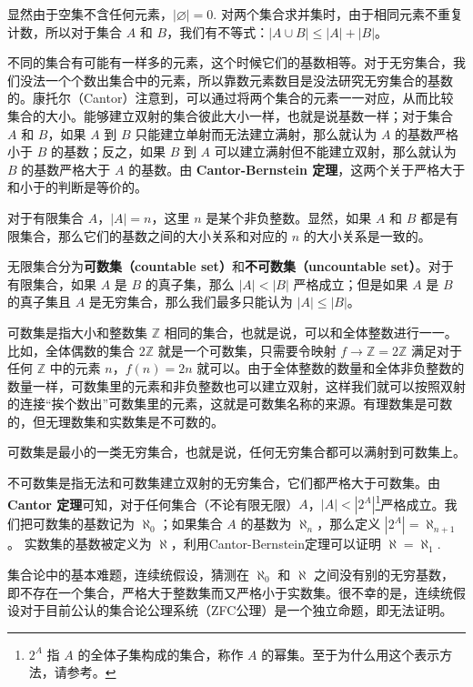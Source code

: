 

显然由于空集不含任何元素，$|\varnothing|=0$. 对两个集合求并集时，由于相同元素不重复计数，所以对于集合 $A$ 和 $B$，我们有不等式：$|A\cup B|\leqslant|A|+|B|$。

不同的集合有可能有一样多的元素，这个时候它们的基数相等。对于无穷集合，我们没法一个个数出集合中的元素，所以靠数元素数目是没法研究无穷集合的基数的。康托尔（Cantor）注意到，可以通过将两个集合的元素一一对应，从而比较集合的大小。能够建立双射的集合彼此大小一样，也就是说基数一样；对于集合 $A$ 和 $B$，如果 $A$ 到 $B$ 只能建立单射而无法建立满射，那么就认为 $A$ 的基数严格小于 $B$ 的基数；反之，如果 $B$ 到 $A$ 可以建立满射但不能建立双射，那么就认为 $B$ 的基数严格大于 $A$ 的基数。由 \textbf{Cantor-Bernstein 定理}，这两个关于严格大于和小于的判断是等价的。

对于有限集合 $A$，$|A|=n$，这里 $n$ 是某个非负整数。显然，如果 $A$ 和 $B$ 都是有限集合，那么它们的基数之间的大小关系和对应的 $n$ 的大小关系是一致的。

无限集合分为\textbf{可数集（countable set）}和\textbf{不可数集（uncountable set）}。对于有限集合，如果 $A$ 是 $B$ 的真子集，那么 $|A|<|B|$ 严格成立；但是如果 $A$ 是 $B$ 的真子集且 $A$ 是无穷集合，那么我们最多只能认为 $|A|\leqslant|B|$。

可数集是指大小和整数集 $\mathbb{Z}$ 相同的集合，也就是说，可以和全体整数进行一一。 比如，全体偶数的集合 $2\mathbb{Z}$ 就是一个可数集，只需要令映射 $f\rightarrow \mathbb{Z}=2\mathbb{Z}$ 满足对于任何 $\mathbb{Z}$ 中的元素 $n$，$f(n)=2n$ 就可以。由于全体整数的数量和全体非负整数的数量一样，可数集里的元素和非负整数也可以建立双射，这样我们就可以按照双射的连接“挨个数出”可数集里的元素，这就是可数集名称的来源。有理数集是可数的，但无理数集和实数集是不可数的。

可数集是最小的一类无穷集合，也就是说，任何无穷集合都可以满射到可数集上。

不可数集是指无法和可数集建立双射的无穷集合，它们都严格大于可数集。由 \textbf{Cantor 定理}可知，对于任何集合（不论有限无限）$A$，$|A|<|2^A|$\footnote{$2^A$ 指 $A$ 的全体子集构成的集合，称作 $A$ 的幂集。至于为什么用这个表示方法，请参考。}严格成立。我们把可数集的基数记为 $\aleph_0$；如果集合 $A$ 的基数为 $\aleph_n$，那么定义 $|2^A|=\aleph_{n+1}$。 实数集的基数被定义为 $\aleph$，利用Cantor-Bernstein定理可以证明 $\aleph=\aleph_1$. 

集合论中的基本难题，连续统假设，猜测在 $\aleph_0$ 和 $\aleph$ 之间没有别的无穷基数，即不存在一个集合，严格大于整数集而又严格小于实数集。很不幸的是，连续统假设对于目前公认的集合论公理系统（ZFC公理）是一个独立命题，即无法证明。


